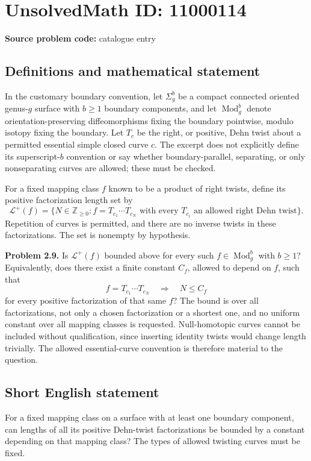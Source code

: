 \documentclass[11pt]{article}
\newcommand{\Z}{\mathbb{Z}}
\begin{document}
\section*{UnsolvedMath ID: 11000114}
\textbf{Source problem code:} catalogue entry
\subsection{Definitions and mathematical statement}
In the customary boundary convention, let $\Sigma_g^b$ be a compact connected oriented genus-$g$ surface with $b\ge1$ boundary components, and let $\operatorname{Mod}_g^b$ denote orientation-preserving diffeomorphisms fixing the boundary pointwise, modulo isotopy fixing the boundary. Let $T_c$ be the right, or positive, Dehn twist about a permitted essential simple closed curve $c$. The excerpt does not explicitly define its superscript-$b$ convention or say whether boundary-parallel, separating, or only nonseparating curves are allowed; these must be checked.

For a fixed mapping class $f$ known to be a product of right twists, define its positive factorization length set by
\[
 \mathcal L^+(f)=\{N\in\Z_{\ge0}:f=T_{c_1}\cdots T_{c_N}\text{ with every }T_{c_i}\text{ an allowed right Dehn twist}\}.
\]
Repetition of curves is permitted, and there are no inverse twists in these factorizations. The set is nonempty by hypothesis.

\textbf{Problem 2.9.} Is $\mathcal L^+(f)$ bounded above for every such $f\in\operatorname{Mod}_g^b$ with $b\ge1$? Equivalently, does there exist a finite constant $C_f$, allowed to depend on $f$, such that
\[
 f=T_{c_1}\cdots T_{c_N}\quad\Longrightarrow\quad N\le C_f
\]
for every positive factorization of that same $f$? The bound is over all factorizations, not only a chosen factorization or a shortest one, and no uniform constant over all mapping classes is requested. Null-homotopic curves cannot be included without qualification, since inserting identity twists would change length trivially. The allowed essential-curve convention is therefore material to the question.
\subsection{Short English statement}
For a fixed mapping class on a surface with at least one boundary component, can lengths of all its positive Dehn-twist factorizations be bounded by a constant depending on that mapping class? The types of allowed twisting curves must be fixed.
\end{document}
